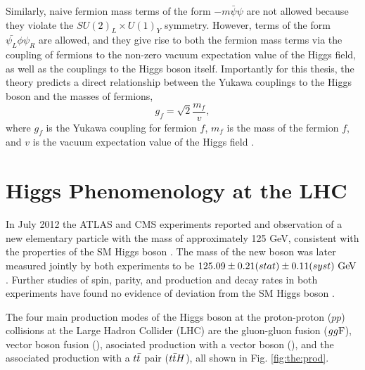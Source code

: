 Similarly, naive fermion mass terms of the form $-m \bar{\psi}\psi$ are not allowed because
they violate the $SU(2)_L \times U(1)_Y$ symmetry. However, terms of the form
$\bar{\psi_L}\phi\psi_R$ are allowed, and they give rise to both the fermion mass terms
via the coupling of fermions to the non-zero vacuum expectation value of the Higgs field,
as well as the couplings to the Higgs boson itself. Importantly for this thesis, the theory
predicts a direct relationship between the Yukawa couplings to the Higgs boson and the
masses of fermions,
\begin{equation}
g_f = \sqrt{2}\frac{m_f}{v},
\end{equation}
where $g_f$ is the Yukawa coupling for fermion $f$, $m_f$ is the mass of the fermion $f$,
and $v$ is the vacuum expectation value of the Higgs field \cite{Thomson:2013zua}.

\section{Higgs Phenomenology at the LHC}

In July 2012 the ATLAS and CMS experiments reported and observation of a new elementary particle with the
mass of approximately 125 GeV, consistent with the properties of the SM Higgs boson
\cite{Aad:2012tfa, Chatrchyan:2012xdj}. The mass of the new boson was later measured
jointly by both experiments to be $125.09 \pm 0.21 (stat) \pm 0.11 (syst)~\text{Ge\kern -0.1em V}$
\cite{Aad:2015zhl}. Further studies of spin, parity, and production
and decay rates in both experiments have found no evidence of deviation from the SM
Higgs boson \cite{Aad:2015mxa, PhysRevD.92.012004, Khachatryan:2016vau, Aad:2019mbh}.

The four main production modes of the Higgs boson at the proton-proton ($pp$) collisions
at the Large Hadron Collider (LHC) are the gluon-gluon fusion ($gg\text{F}$), vector boson fusion
(\vbf), asociated production with a vector boson (\vh), and the associated production with
a $t\bar{t}$ pair ($t\bar{t} H$), all shown in Fig. \ref{fig:the:prod}.

